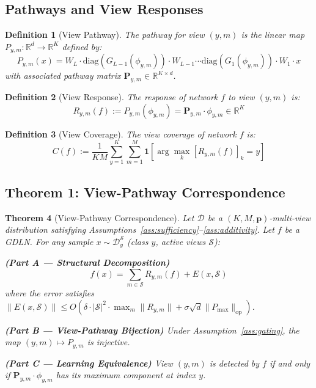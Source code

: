 \documentclass{article}
\newtheorem{theorem}{Theorem}
\newtheorem{definition}[theorem]{Definition}
\newcommand{\R}{\mathbb{R}}
\newcommand{\cD}{\mathcal{D}}
\newcommand{\cS}{\mathcal{S}}
\begin{document}
\subsection{Pathways and View Responses}

\begin{definition}[View Pathway]
The pathway for view $(y,m)$ is the linear map $P_{y,m} : \R^d \to \R^K$ defined by:
\begin{equation}
    P_{y,m}(x) = W_L \cdot \text{diag}(G_{L-1}(\phi_{y,m})) \cdot W_{L-1} \cdots \text{diag}(G_1(\phi_{y,m})) \cdot W_1 \cdot x
\end{equation}
with associated pathway matrix $\mathbf{P}_{y,m} \in \R^{K \times d}$.
\end{definition}

\begin{definition}[View Response]
The response of network $f$ to view $(y,m)$ is:
\begin{equation}
    R_{y,m}(f) := P_{y,m}(\phi_{y,m}) = \mathbf{P}_{y,m} \cdot \phi_{y,m} \in \R^K
\end{equation}
\end{definition}

\begin{definition}[View Coverage]
The view coverage of network $f$ is:
\begin{equation}
    C(f) := \frac{1}{KM} \sum_{y=1}^{K} \sum_{m=1}^{M} \mathbf{1}\left[ \arg\max_k [R_{y,m}(f)]_k = y \right]
\end{equation}
\end{definition}

\subsection{Theorem 1: View-Pathway Correspondence}

\begin{theorem}[View-Pathway Correspondence]
\label{thm:correspondence}
Let $\cD$ be a $(K, M, \mathbf{p})$-multi-view distribution satisfying Assumptions~\ref{ass:sufficiency}--\ref{ass:additivity}. Let $f$ be a GDLN. For any sample $x \sim \cD_y^{\cS}$ (class $y$, active views $\cS$):

\textbf{(Part A --- Structural Decomposition)}
\begin{equation}
    f(x) = \sum_{m \in \cS} R_{y,m}(f) + E(x, \cS)
\end{equation}
where the error satisfies $\|E(x, \cS)\| \leq O(\delta \cdot |\cS|^2 \cdot \max_m \|R_{y,m}\| + \sigma \sqrt{d} \|P_{\max}\|_{\text{op}})$.

\textbf{(Part B --- View-Pathway Bijection)} Under Assumption~\ref{ass:gating}, the map $(y,m) \mapsto P_{y,m}$ is injective.

\textbf{(Part C --- Learning Equivalence)} View $(y,m)$ is detected by $f$ if and only if $\mathbf{P}_{y,m} \cdot \phi_{y,m}$ has its maximum component at index $y$.
\end{theorem}
\end{document}
